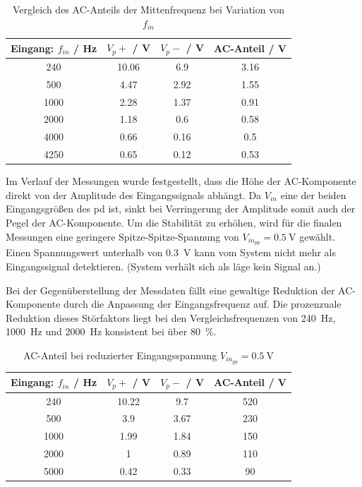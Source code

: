 \documentclass[../main_config.tex]{subfiles}
\begin{document}
\begin{table}[h]
    \centering
    \begin{tabular}{c|c|c|c}
        \textbf{Eingang: $f_{in}$ / \si{\hertz}} & \textbf{$V_p+$ / \si{\volt}} & \textbf{$V_p-$ / \si{\volt}} & \textbf{AC-Anteil / \si{\volt}}  \\ \hline
        240 & 10.06 & 6.9 & 3.16 \\
        500 & 4.47 & 2.92 & 1.55 \\
        1000 & 2.28 & 1.37 & 0.91 \\
        2000 & 1.18 & 0.6 & 0.58 \\
        4000 & 0.66 & 0.16 & 0.5 \\
        4250 & 0.65 & 0.12 & 0.53 \\
    \end{tabular}
    \caption{Vergleich des AC-Anteils der Mittenfrequenz bei Variation von $f_{in}$}
    \label{tab:ausw_mess_vc}
\end{table}


Im Verlauf der Messungen wurde festgestellt, dass die Höhe der AC-Komponente direkt von der Amplitude des Eingangssignals abhängt. Da $V_{in}$ eine der beiden Eingangsgrößen des \gls{pd} ist, sinkt bei Verringerung der Amplitude somit auch der Pegel der AC-Komponente. Um die Stabilität zu erhöhen, wird für die finalen Messungen eine geringere Spitze-Spitze-Spannung von $V_{in_{pp}} = \SI{0.5}{\volt}$ gewählt. Einen Spannungswert unterhalb von \SI{0.3}{\volt} kann vom System nicht mehr als Eingangssignal detektieren. (System verhält sich als läge kein Signal an.)\par
\medskip

Bei der Gegenüberstellung der Messdaten fällt eine gewaltige Reduktion der AC-Komponente durch die Anpassung der Eingangsfrequenz auf. Die prozenzuale Reduktion dieses Störfaktors liegt bei den Vergleichsfrequenzen von \SI{240}{\hertz}, \SI{1000}{\hertz} und \SI{2000}{\hertz} konsistent bei über \SI{80}{\percent}. \par
\medskip

\begin{table}[h]
    \centering
    \begin{tabular}{c|c|c|c}
        \textbf{Eingang: $f_{in}$ / \si{\hertz}} & \textbf{$V_p+$ / \si{\volt}} & \textbf{$V_p-$ / \si{\volt}} & \textbf{AC-Anteil / \si{\volt}}  \\ \hline
        240 & 10.22 & 9.7 & 520 \\
        500 & 3.9 & 3.67 & 230 \\
        1000 & 1.99 & 1.84 & 150 \\
        2000 & 1 & 0.89 & 110 \\
        5000 & 0.42 & 0.33 & 90 \\
    \end{tabular}
    \caption{AC-Anteil bei reduzierter Eingangsspannung $V_{in_{pp}}=\SI{0.5}{\volt}$}
    \label{tab:ausw_mess_mfreq05}
\end{table}
\end{document}
